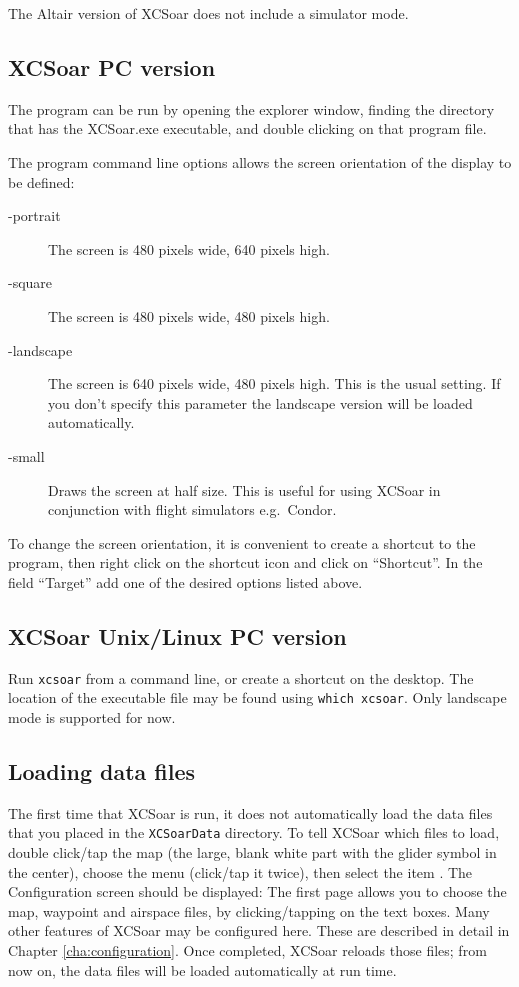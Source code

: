 The Altair version of XCSoar does not include a simulator mode.

\subsection*{XCSoar PC version}
The program can be run by opening the explorer window, finding the directory
that has the XCSoar.exe executable, and double clicking on that program file.

The program command line options allows the screen orientation of
the display to be defined:
\begin{description}
\item[-portrait] The screen is 480 pixels wide, 640 pixels high.
\item[-square] The screen is 480 pixels wide, 480 pixels high.
\item[-landscape] The screen is 640 pixels wide, 480 pixels high. This is the
usual setting. If you don't specify this parameter the landscape version will be
loaded automatically.
\item[-small] Draws the screen at half size.  This is useful for using XCSoar in
 conjunction with flight simulators e.g.\ Condor.
\end{description}
To change the screen orientation, it is convenient to create a shortcut to the
program, then right click on the shortcut icon and click on ``Shortcut''. 
In the field ``Target'' add one of the desired options listed above.

\subsection*{XCSoar Unix/Linux PC version}
Run \verb|xcsoar| from a command line, or create a shortcut on the
desktop.  The location of the executable file may be found using
\verb|which xcsoar|.  Only landscape mode is  supported for now.

\subsection*{Loading data files}
The first time that XCSoar is run, it does not automatically load the 
data files that you placed in the \verb|XCSoarData| directory.  
To tell XCSoar which files to load, double click/tap the map (the large,
blank white part with the glider symbol in the center),
choose the menu  (click/tap it twice), then select the item 
.  The Configuration screen should be displayed:
The first page allows you to choose the map, 
waypoint and airspace files, by clicking/tapping on the text boxes.
Many other features of XCSoar may be configured here. These are described in detail in Chapter
\ref{cha:configuration}.
Once completed, XCSoar reloads those files; from now on, the data files
will be loaded automatically at run time.


